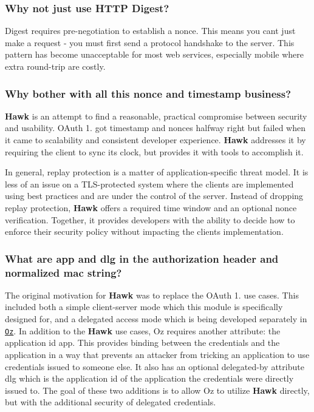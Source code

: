 \subsubsection*{Why not just use H\+T\+T\+P Digest?}

Digest requires pre-\/negotiation to establish a nonce. This means you can\textquotesingle{}t just make a request -\/ you must first send a protocol handshake to the server. This pattern has become unacceptable for most web services, especially mobile where extra round-\/trip are costly.

\subsubsection*{Why bother with all this nonce and timestamp business?}

{\bfseries Hawk} is an attempt to find a reasonable, practical compromise between security and usability. O\+Auth 1. got timestamp and nonces halfway right but failed when it came to scalability and consistent developer experience. {\bfseries Hawk} addresses it by requiring the client to sync its clock, but provides it with tools to accomplish it.

In general, replay protection is a matter of application-\/specific threat model. It is less of an issue on a T\+L\+S-\/protected system where the clients are implemented using best practices and are under the control of the server. Instead of dropping replay protection, {\bfseries Hawk} offers a required time window and an optional nonce verification. Together, it provides developers with the ability to decide how to enforce their security policy without impacting the client\textquotesingle{}s implementation.

\subsubsection*{What are {\ttfamily app} and {\ttfamily dlg} in the authorization header and normalized mac string?}

The original motivation for {\bfseries Hawk} was to replace the O\+Auth 1. use cases. This included both a simple client-\/server mode which this module is specifically designed for, and a delegated access mode which is being developed separately in \href{https://github.com/hueniverse/oz}{\tt Oz}. In addition to the {\bfseries Hawk} use cases, Oz requires another attribute\+: the application id {\ttfamily app}. This provides binding between the credentials and the application in a way that prevents an attacker from tricking an application to use credentials issued to someone else. It also has an optional \textquotesingle{}delegated-\/by\textquotesingle{} attribute {\ttfamily dlg} which is the application id of the application the credentials were directly issued to. The goal of these two additions is to allow Oz to utilize {\bfseries Hawk} directly, but with the additional security of delegated credentials.

